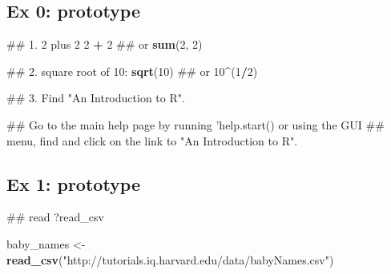 \documentclass[]{book}
\newenvironment{Shaded}{\begin{snugshade}}{\end{snugshade}}
\newcommand{\KeywordTok}[1]{\textcolor[rgb]{0.13,0.29,0.53}{\textbf{#1}}}
\newcommand{\DecValTok}[1]{\textcolor[rgb]{0.00,0.00,0.81}{#1}}
\newcommand{\StringTok}[1]{\textcolor[rgb]{0.31,0.60,0.02}{#1}}
\newcommand{\OperatorTok}[1]{\textcolor[rgb]{0.81,0.36,0.00}{\textbf{#1}}}
\newcommand{\NormalTok}[1]{#1}
\begin{document}
\subsection{Ex 0: prototype}\label{ex-0-prototype}

\begin{Shaded}
\begin{Highlighting}[]
\NormalTok{## 1. 2 plus 2}
\DecValTok{2} \OperatorTok{+}\StringTok{ }\DecValTok{2}
\NormalTok{## or}
\KeywordTok{sum}\NormalTok{(}\DecValTok{2}\NormalTok{, }\DecValTok{2}\NormalTok{)}
\end{Highlighting}
\end{Shaded}

\begin{Shaded}
\begin{Highlighting}[]
\NormalTok{## 2. square root of 10:}
\KeywordTok{sqrt}\NormalTok{(}\DecValTok{10}\NormalTok{)}
\NormalTok{## or}
\DecValTok{10}\OperatorTok{^}\NormalTok{(}\DecValTok{1}\OperatorTok{/}\DecValTok{2}\NormalTok{)}
\end{Highlighting}
\end{Shaded}

\begin{Shaded}
\begin{Highlighting}[]
\NormalTok{## 3. Find "An Introduction to R".}
\end{Highlighting}
\end{Shaded}

\begin{Shaded}
\begin{Highlighting}[]
\NormalTok{## Go to the main help page by running 'help.start() or using the GUI}
\NormalTok{## menu, find and click on the link to "An Introduction to R".}
\end{Highlighting}
\end{Shaded}

\subsection{Ex 1: prototype}\label{ex-1-prototype}

\begin{Shaded}
\begin{Highlighting}[]
\NormalTok{## read ?read_csv}
\end{Highlighting}
\end{Shaded}

\begin{Shaded}
\begin{Highlighting}[]
\NormalTok{baby_names <-}\StringTok{ }\KeywordTok{read_csv}\NormalTok{(}\StringTok{"http://tutorials.iq.harvard.edu/data/babyNames.csv"}\NormalTok{)}
\end{Highlighting}
\end{Shaded}
\end{document}
